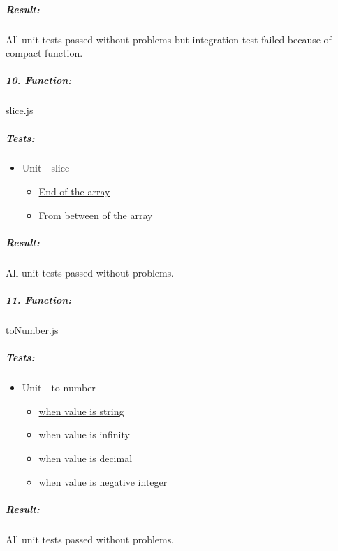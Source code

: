 \documentclass[a4paper, 12pt]{article}
\begin{document}
		\hypertarget{header-n438}{%
		\subparagraph{Result:}\label{header-n438}}
		
		All unit tests passed without problems but integration test failed
		because of compact function.



		\hypertarget{header-n472}{%
		\subparagraph{10. Function:}\label{header-n472}}
		
		slice.js
		
		\hypertarget{header-n474}{%
		\subparagraph{Tests:}\label{header-n474}}
		
		\begin{itemize}
		\item
		Unit - slice
		
		\begin{itemize}
			\item
			\underline{End of the array}
			\item
			From between of the array
		\end{itemize}
		\end{itemize}
		
		\hypertarget{header-n487}{%
		\subparagraph{Result:}\label{header-n487}}
		
		All unit tests passed without problems.



		\hypertarget{header-n515}{%
		\subparagraph{11. Function:}\label{header-n515}}
		
		toNumber.js
		
		\hypertarget{header-n517}{%
		\subparagraph{Tests:}\label{header-n517}}
		
		\begin{itemize}
		\item
		Unit - to number
		
		\begin{itemize}
			\item
			\underline{when value is string}
			\item
			when value is infinity
			\item
			when value is decimal
			\item
			when value is negative integer
		\end{itemize}
		\end{itemize}
		
		\hypertarget{header-n526}{%
		\subparagraph{Result:}\label{header-n526}}
		
		All unit tests passed without problems.
\end{document}
